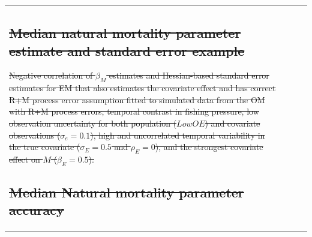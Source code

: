 \documentclass[
  12pt,
]{article}
\makeatletter
\providecommand{\DIFdel}[1]{{\protect\color{red}\sout{#1}}} %
\providecommand{\DIFdelFL}[1]{\DIFdel{#1}} %
\let\sout@orig\sout %
\renewcommand{\sout}[1]{\ifmmode\text{\sout@orig{\ensuremath{#1}}}\else\sout@orig{#1}\fi} %
\makeatother
\begin{document}
\begin{table}
{\begin{center}
\begin{tabular}{lrrr}
\subsection*{\DIFdel{Median natural mortality parameter estimate and standard error example}}%
\addcontentsline{toc}{subsection}{\DIFdel{Median natural mortality parameter estimate and standard error example}}

{%
\DIFdelFL{Negative correlation of $\beta_M$ estimates and Hessian-based standard error estimates for EM that also estimates the covariate effect and has correct R+M process error assumption fitted to simulated data from the OM with R+M process errors, temporal contrast in fishing pressure, low observation uncertainty for both population ($Low OE$) and covariate observations ($\sigma_e = 0.1$), high and uncorrelated temporal variability in the true covariate ($\sigma_E = 0.5$ and $\rho_E = 0$), and the strongest covariate effect on $M$ ($\beta_E = 0.5$).}}%

\subsection*{\DIFdel{Median Natural mortality parameter accuracy}}%
\addcontentsline{toc}{subsection}{\DIFdel{Median Natural mortality parameter accuracy}}


\end{tabular}
\end{center}}
\end{table}
\end{document}
